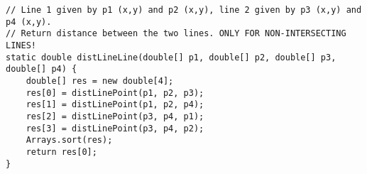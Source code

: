 \begin{verbatim}
// Line 1 given by p1 (x,y) and p2 (x,y), line 2 given by p3 (x,y) and p4 (x,y).
// Return distance between the two lines. ONLY FOR NON-INTERSECTING LINES!
static double distLineLine(double[] p1, double[] p2, double[] p3, double[] p4) {
	double[] res = new double[4];
	res[0] = distLinePoint(p1, p2, p3);
	res[1] = distLinePoint(p1, p2, p4);
	res[2] = distLinePoint(p3, p4, p1);
	res[3] = distLinePoint(p3, p4, p2);
	Arrays.sort(res);
	return res[0];
}
\end{verbatim}